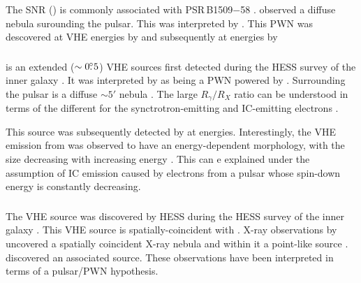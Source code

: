 \subsubsection{\mshfifteenfiftytwo}

The \ac{SNR}  (\mshfifteenfiftytwo)
\cite{caswell_1981a_high-resolution-radio} is commonly
associated with PSR\,B1509$-$58 \cite{seward_1982a_x-ray-pulsar}.
\cite{seward_1982a_x-ray-pulsar} observed a diffuse nebula surounding the
pulsar. This was interpreted by \cite{trussoni_1996a_rosat-observations}.
This \ac{PWN} was descovered at \ac{VHE} energies by
\cite{aharonian_2005a_discovery-extended} and subsequently at \gev
energies by \cite{abdo_2010a_detection-energetic}

\subsubsection{}

 is an extended ($\sim0\mbox{$.\!\!^\circ$}5$) \ac{VHE} sources
first detected during the \ac{HESS} survey of the inner
galaxy \citep{aharonian_2006a_h.e.s.s.-survey}.  It was
interpreted by \cite{aharonian_2005a_possible-association}
as being a \ac{PWN} powered by  \citep[also known as
,][]{clifton_1992a_high-frequency-survey}.  Surrounding the
pulsar is a diffuse $\sim 5'$ nebula \cite{finley_1996a_morphology-young}.
The large $R_\gamma/R_X$ ratio can be understood in terms of the
different for the synctrotron-emitting and \ac{IC}-emitting electrons
\citep{aharonian_2006a_h.e.s.s.-survey}.

This source was subsequently detected by
\cite{grondin_2011a_detection-pulsar} at \gev energies.  Interestingly,
the \ac{VHE} emission from  was observed to have an
energy-dependent morphology, with the size decreasing with increasing
energy \citep{aharonian_2006a_energy-dependent}.  This can e explained
under the assumption of \ac{IC} emission caused by electrons from a
pulsar whose spin-down energy is constantly decreasing.

\subsubsection{}



The \ac{VHE} source  was discovered by
\ac{HESS} during the \ac{HESS} survey of the inner
galaxy \citep{aharonian_2006a_h.e.s.s.-survey}.  This
\ac{VHE} source is spatially-coincident with 
\citep{shaver_1970a_galactic-radio}.  X-ray observations by
\xmmnewton uncovered a spatially coincident X-ray nebula and within it
a point-like source \cite{funk_2007a_xmm-newton-observations}.
\cite{slane_2010_fermi-detection} discovered an associated \gev source.
These observations have been interpreted in terms of a pulsar/\ac{PWN}
hypothesis.

